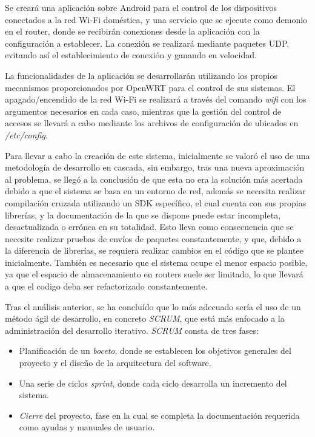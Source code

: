 \documentclass[12pt]{article}
\begin{document}
    Se creará una aplicación sobre Android para el control de los dispositivos conectados a la red Wi-Fi doméstica, y una servicio que se ejecute como demonio en el router, donde se recibirán conexiones desde la aplicación con la configuración a establecer. La conexión se realizará mediante paquetes UDP, evitando así el establecimiento de conexión y ganando en velocidad.

    La funcionalidades de la aplicación se desarrollarán utilizando los propios mecanismos proporcionados por OpenWRT para el control de sus sistemas. El apagado/encendido de la red Wi-Fi se realizará a través del comando \textit{wifi} con los argumentos necesarios en cada caso, mientras que la gestión del control de accesos se llevará a cabo mediante los archivos de configuración de ubicados en \textit{/etc/config}.

    Para llevar a cabo la creación de este sistema, inicialmente se valoró el uso de una metodología de desarrollo en cascada, sin embargo, tras una nueva aproximación al problema, se llegó a la conclusión de que esta no era la solución más acertada debido a que el sistema se basa en un entorno de red, además se necesita realizar compilación cruzada utilizando un SDK específico, el cual cuenta con sus propias librerías, y la documentación de la que se dispone puede estar incompleta, desactualizada o errónea en su totalidad. Esto lleva como consecuencia que se necesite realizar pruebas de envíos de paquetes constantemente, y que, debido a la diferencia de librerías, se requiera realizar cambios en el código que se plantee inicialmente. También es necesario que el sistema ocupe el menor espacio posible, ya que el espacio de almacenamiento en routers suele ser limitado, lo que llevará a que el codigo deba ser refactorizado constantemente.
    
    Tras el análisis anterior, se ha concluído que lo más adecuado sería el uso de un método ágil de desarrollo, en concreto \textit{SCRUM}, que está más enfocado a la administración del desarrollo iterativo. \textit{SCRUM} consta de tres fases:
    
    \begin{itemize}
        \item Planificación de un \textit{boceto}, donde se establecen los objetivos generales del proyecto y el diseño de la arquitectura del software.
        \item Una serie de ciclos \textit{sprint}, donde cada ciclo desarrolla un incremento del sistema.
        \item \textit{Cierre} del proyecto, fase en la cual se completa la documentación requerida como ayudas y manuales de usuario.
    \end{itemize}
\end{document}
